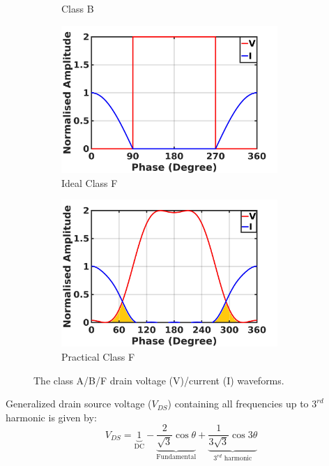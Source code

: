 \documentclass[conference]{IEEEtran}
\begin{document}
\begin{figure}[h]
\begin{subfigure}{0.24\textwidth}
\caption{Class B}
\label{fig:CB_wave_VI}
\end{subfigure}
\begin{subfigure}{0.24\textwidth}
\includegraphics[width=0.9\textwidth]{Images/Intro/ClassF.jpg}
\caption{Ideal Class F}
\label{fig:ICF_wave_VI}
\end{subfigure}
\begin{subfigure}{0.24\textwidth}
\includegraphics[width=0.9\textwidth]{Images/Intro/CF_wave_VI_shaded.jpg}
\caption{Practical Class F}
\label{fig:CF_wave_VI}
\end{subfigure}
\caption{\color{blue}The class A/B/F drain \color{blue} voltage (V)/current (I) waveforms. \color{black}}
\label{fig:wave_VI}
\vspace{-0.25in}
\end{figure}
Generalized drain source voltage ($V_{DS}$) containing all frequencies up to $3^{rd}$ harmonic \cite{Gen_Vds_eqn} is given by:
\begin{equation}
V_{DS}=\underbrace{1}_{\text{DC}}-\underbrace{\frac{2}{\sqrt{3}} \cos \theta}_{\text{Fundamental}}+\underbrace{\frac{1}{3 \sqrt{3}} \cos 3 \theta}_{\text{$3^{rd}$ harmonic}}
\label{eqn_CF_V}
\end{equation}
\end{document}
